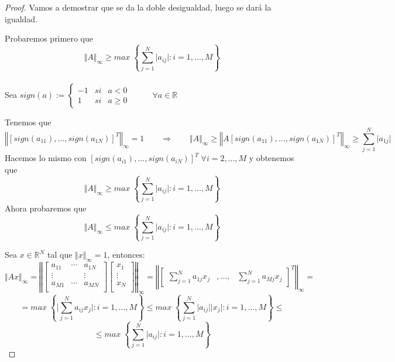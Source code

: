 \begin{proof} Vamos a demostrar que se da la doble desigualdad, luego se dará la igualdad.

Probaremos primero que $$ \Vert A \Vert _\infty \geq max \; \left\lbrace \sum_{j=1}^N \vert a_{ij} \vert : i = 1,...,M \right\rbrace $$\\
Sea $sign(a) := \left\{ \begin{array}{lcc}
-1 & si & a < 0 \\
1 & si & a \geq 0
\end{array}
\right.$ $\qquad$ $\forall a \in \mathbb{R}$

Tenemos que
\[ \left\Vert \left[ sign(a_{11}),...,sign(a_{1N}) \right] ^T \right\Vert _\infty = 1 \qquad \Rightarrow \qquad \Vert A \Vert _\infty \geq \left\Vert A \left[ sign(a_{11}),...,sign(a_{1N}) \right] ^T \right\Vert _\infty \geq \sum_{j=1}^N \vert a_{1j} \vert \]
Hacemos lo mismo con $\left[ sign(a_{i1}),...,sign(a_{iN}) \right] ^T \; \forall i = 2,...,M$ y obtenemos que
\[ \Vert A \Vert _\infty \geq max \; \left\lbrace \sum_{j=1}^N \vert a_{ij} \vert : i = 1,...,M \right\rbrace \]
Ahora probaremos que $$ \Vert A \Vert _\infty \leq max \; \left\lbrace \sum_{j=1}^N \vert a_{ij} \vert : i = 1,...,M \right\rbrace $$

Sea $x \in \mathbb{R}^N$ tal que $\Vert x \Vert _\infty = 1$, entonces:
\[ \Vert Ax \Vert _\infty = \left\Vert 
\begin{bmatrix} 
a_{11} &  \cdots & a_{1N} \\
\vdots & & \vdots 
\\ a_{M1} & \cdots & a_{MN} \\ \end{bmatrix} 
\begin{bmatrix}
x_1 \\
\vdots \\
x_N \\
\end{bmatrix}
\right\Vert _\infty = \left\Vert 
\begin{bmatrix}
\sum_{j=1}^N a_{1j}x_j & ,\ldots , & \sum_{j=1}^N a_{Mj}x_j 
\end{bmatrix} ^T
\right\Vert _\infty = \] \[= max \; \left\lbrace \vert \sum_{j=1}^N a_{ij}x_j \vert : i = 1,...,M \right\rbrace \leq max \; \left\lbrace \sum_{j=1}^N \vert a_{ij} \vert \vert x_j \vert : i = 1,...,M \right\rbrace \leq \] \[ \leq max \; \left\lbrace \sum_{j=1}^N \vert a_{ij} \vert : i = 1,...,M \right\rbrace \] 
\end{proof}

